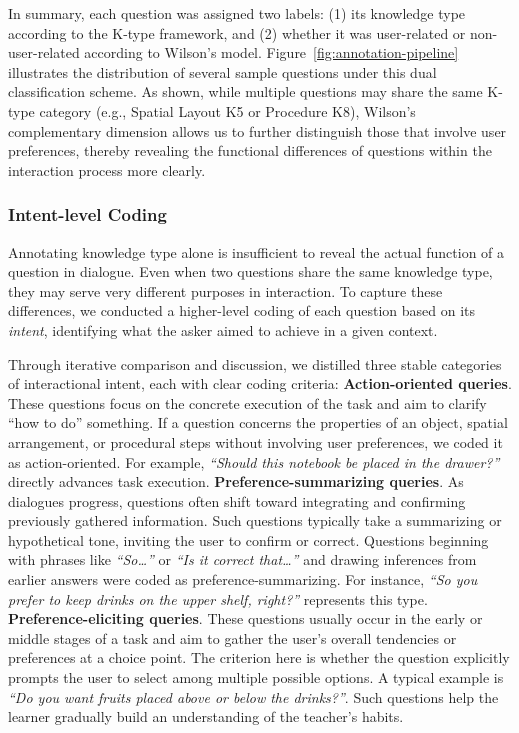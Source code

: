 \documentclass[sigconf,authordraft]{acmart}
\begin{document}
In summary, each question was assigned two labels: (1) its knowledge type according to the K-type framework, and (2) whether it was user-related or non-user-related according to Wilson’s model. Figure~\ref{fig:annotation-pipeline} illustrates the distribution of several sample questions under this dual classification scheme. As shown, while multiple questions may share the same K-type category (e.g., Spatial Layout K5 or Procedure K8), Wilson’s complementary dimension allows us to further distinguish those that involve user preferences, thereby revealing the functional differences of questions within the interaction process more clearly.

\subsubsection{Intent-level Coding}
Annotating knowledge type alone is insufficient to reveal the actual function of a question in dialogue. Even when two questions share the same knowledge type, they may serve very different purposes in interaction. To capture these differences, we conducted a higher-level coding of each question based on its \textit{intent}, identifying what the asker aimed to achieve in a given context. 

Through iterative comparison and discussion, we distilled three stable categories of interactional intent, each with clear coding criteria:  \textbf{Action-oriented queries}. These questions focus on the concrete execution of the task and aim to clarify “how to do” something. If a question concerns the properties of an object, spatial arrangement, or procedural steps without involving user preferences, we coded it as action-oriented. For example, \textit{``Should this notebook be placed in the drawer?''} directly advances task execution. \textbf{Preference-summarizing queries}. As dialogues progress, questions often shift toward integrating and confirming previously gathered information. Such questions typically take a summarizing or hypothetical tone, inviting the user to confirm or correct. Questions beginning with phrases like \textit{``So\ldots''} or \textit{``Is it correct that\ldots''}
and drawing inferences from earlier answers were coded as preference-summarizing. For instance, \textit{``So you prefer to keep drinks on the upper shelf, right?''} represents this type. \textbf{Preference-eliciting queries}. These questions usually occur in the early or middle stages of a task and aim to gather the user’s overall tendencies or preferences at a choice point. The criterion here is whether the question explicitly prompts the user to select among multiple possible options. A typical example is \textit{``Do you want fruits placed above or below the drinks?''}. Such questions help the learner gradually build an understanding of the teacher’s habits.
\end{document}
